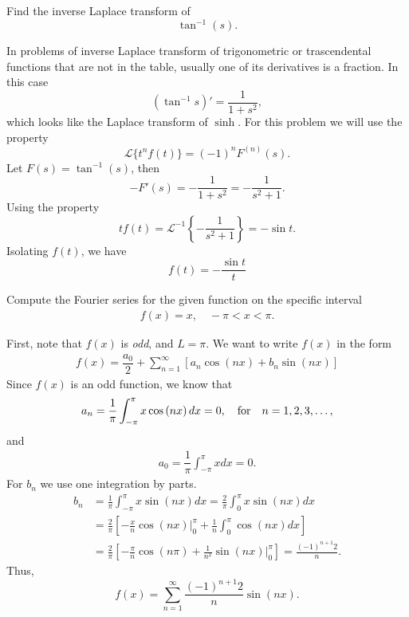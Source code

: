 \documentclass[11pt]{article}
\begin{document}
\begin{problem}
Find the inverse Laplace transform of 
\[\tan^{-1} (s).\]
\end{problem}
\begin{solution}
In problems of inverse Laplace transform of trigonometric or trascendental functions that are not in the table, usually one of its derivatives is a fraction. In this case
\[(\tan^{-1}s)'=\frac{1}{1+s^{2}},\]
which looks like the Laplace transform of $\sinh$. For this problem we will use the property
\[\mathcal{L}\{t^{n}f(t)\}=(-1)^{n}F^{(n)}(s).\]
Let $F(s)=\tan^{-1}(s)$, then
\[-F'(s)=-\frac{1}{1+s^{2}}=-\frac{1}{s^{2}+1}.\]
Using the property
\[tf(t) =\mathcal{L}^{-1}\left\{-\frac{1}{s^{2}+1}\right\}=-\sin t.\]
Isolating $f(t)$, we have
\[\boxed{f(t)=-\frac{\sin t}{t}}\]
\end{solution}




\begin{problem}
Compute the Fourier series for the given function on the specific interval
\begin{eqnarray*}
f(x) = x , \quad -\pi<x<\pi.
\end{eqnarray*}
\end{problem}
\begin{solution}
First, note that $f(x)$ is \textsl{odd}, and $L=\pi$.
We want to write $f(x)$ in the form
\begin{eqnarray*}
f(x) = \dfrac{a_{0}}{2} + \sum_{n=1}^{\infty} \left[ a_{n}\cos\left(n x\right)+b_{n}\sin\left(n x\right) \right]
\end{eqnarray*}
Since $f(x)$ is an odd function, we know that
\begin{eqnarray*}
a_{n} = \dfrac{1}{\pi} \int_{-\pi}^{\pi} x\cos\left(n x\right) dx =0, \quad {\rm for} \quad n =1,2,3,\ldots,
\end{eqnarray*}
and
\begin{eqnarray*}
a_{0} = \dfrac{1}{\pi} \int_{-\pi}^{\pi} x dx =0.
\end{eqnarray*}
For $b_{n}$ we use one integration by parts.
\begin{align*}
b_{n}& = \frac{1}{\pi}\int_{-\pi}^{\pi} x\sin\left(n x\right) dx = \frac{2}{\pi}\int_{0}^{\pi} x\sin\left(n x\right) dx \\
     & = \frac{2}{\pi}\left[ -\frac{x}{n}\cos (nx) |^{\pi}_{0} + \frac{1}{n}\int_{0}^{\pi} \cos\left(n x\right) dx\right] \\
     & = \frac{2}{\pi}\left[ -\frac{\pi}{n}\cos (n\pi)  + \frac{1}{n^{2}}\sin (nx)|^{\pi}_{0} \right] = \frac{(-1)^{n+1}2}{n}.
\end{align*}
Thus,
\[\boxed{f(x) = \sum_{n=1}^{\infty}\frac{(-1)^{n+1}2}{n}\sin(nx)}.\]
\end{solution}
\end{document}
